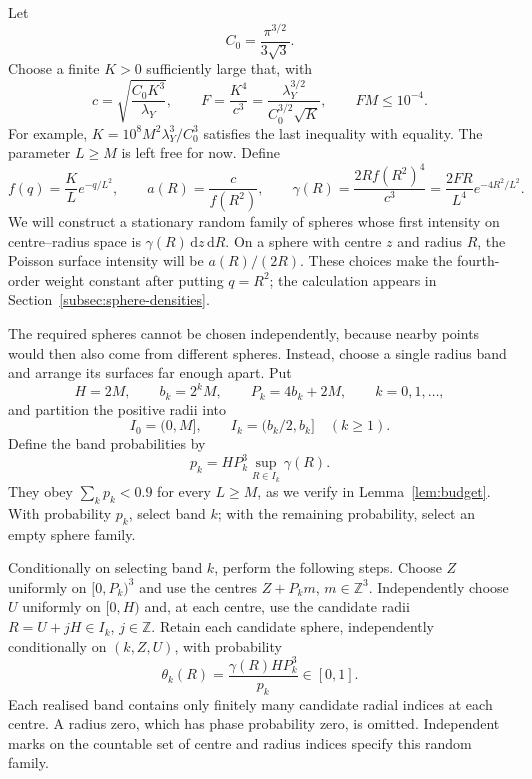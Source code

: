\documentclass[11pt,a4paper]{article}
\numberwithin{equation}{section}
\theoremstyle{definition}
\theoremstyle{remark}
\newcommand{\dd}{\,\mathrm d}
\begin{document}
Let
\begin{equation}
 C_0=\frac{\pi^{3/2}}{3\sqrt3}.
 \label{eq:C0}
\end{equation}
Choose a finite $K>0$ sufficiently large that, with
\begin{equation}
 c=\sqrt{\frac{C_0K^3}{\lambda_Y}},\qquad
 F=\frac{K^4}{c^3}
  =\frac{\lambda_Y^{3/2}}{C_0^{3/2}\sqrt K},
 \qquad FM\leq10^{-4}.
 \label{eq:Kc}
\end{equation}
For example, $K=10^8M^2\lambda_Y^3/C_0^3$ satisfies the last inequality
with equality. The parameter $L\geq M$ is left free for now. Define
\begin{equation}
 f(q)=\frac KL e^{-q/L^2},\qquad
 a(R)=\frac{c}{f(R^2)},\qquad
 \gamma(R)=\frac{2R f(R^2)^4}{c^3}
          =\frac{2FR}{L^4}e^{-4R^2/L^2}.
 \label{eq:sphere-weights}
\end{equation}
We will construct a stationary random family of spheres whose first
intensity on centre--radius space is $\gamma(R)\dd z\dd R$. On a sphere
with centre $z$ and radius $R$, the Poisson surface intensity will be
$a(R)/(2R)$. These choices make the fourth-order weight constant after
putting $q=R^2$; the calculation appears in
Section~\ref{subsec:sphere-densities}.

The required spheres cannot be chosen independently, because nearby
points would then also come from different spheres. Instead, choose a
single radius band and arrange its surfaces far enough apart. Put
\begin{equation}
 H=2M,\qquad b_k=2^kM,\qquad P_k=4b_k+2M,\qquad k=0,1,\ldots,
 \label{eq:band-parameters}
\end{equation}
and partition the positive radii into
\[
 I_0=(0,M],\qquad I_k=(b_k/2,b_k]\quad(k\geq1).
\]
Define the band probabilities by
\begin{equation}
 p_k=HP_k^3\sup_{R\in I_k}\gamma(R).
 \label{eq:band-probabilities}
\end{equation}
They obey $\sum_kp_k<0.9$ for every $L\geq M$, as we verify in
Lemma~\ref{lem:budget}. With probability $p_k$, select band $k$; with the
remaining probability, select an empty sphere family.

Conditionally on selecting band $k$, perform the following steps.
Choose $Z$ uniformly on $[0,P_k)^3$ and use the centres
$Z+P_km$, $m\in\mathbb Z^3$. Independently choose $U$ uniformly on
$[0,H)$ and, at each centre, use the candidate radii
$R=U+jH\in I_k$, $j\in\mathbb Z$. Retain each candidate sphere,
independently conditionally on $(k,Z,U)$, with probability
\begin{equation}
 \theta_k(R)=\frac{\gamma(R)HP_k^3}{p_k}\in[0,1].
 \label{eq:sphere-retention}
\end{equation}
Each realised band contains only finitely many candidate radial indices
at each centre. A radius zero, which has phase probability zero, is
omitted. Independent marks on the countable set of centre and radius
indices specify this random family.
\end{document}
